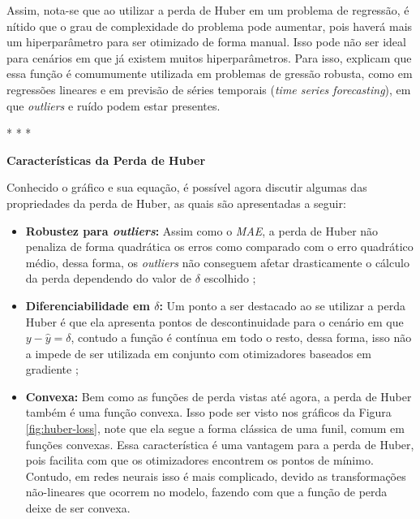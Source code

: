 Assim, nota-se que ao utilizar a perda de Huber em um problema de regressão, é nítido que o grau de complexidade do problema pode aumentar, pois haverá mais um hiperparâmetro para ser otimizado de forma manual. Isso pode não ser ideal para cenários em que já existem muitos hiperparâmetros. Para isso, \textcite{LossesArticle} explicam que essa função é comumumente utilizada em problemas de gressão robusta, como em regressões lineares e em previsão de séries temporais (\textit{time series forecasting}), em que \textit{outliers} e ruído podem estar presentes.

\medskip
\begin{center}
 * * *
\end{center}
\medskip

\textbf{Características da Perda de Huber}
\vspace{1em}

Conhecido o gráfico e sua equação, é possível agora discutir algumas das propriedades da perda de Huber, as quais são apresentadas a seguir:

\begin{itemize}
    \item \textbf{Robustez para \textit{outliers}:} Assim como o \textit{MAE}, a perda de Huber não penaliza de forma quadrática os erros como comparado com o erro quadrático médio, dessa forma, os \textit{outliers} não conseguem afetar drasticamente o cálculo da perda dependendo do valor de $\delta$ escolhido \parencite{LossesArticle};
    \item \textbf{Diferenciabilidade em $\delta$:} Um ponto a ser destacado ao se utilizar a perda Huber é que ela apresenta pontos de descontinuidade para o cenário em que $y - \hat{y} = \delta$, contudo a função é contínua em todo o resto, dessa forma, isso não a impede de ser utilizada em conjunto com otimizadores baseados em gradiente \parencite{LossesArticle};
    \item \textbf{Convexa:} Bem como as funções de perda vistas até agora, a perda de Huber também é uma função convexa. Isso pode ser visto nos gráficos da Figura \ref{fig:huber-loss}, note que ela segue a forma clássica de uma funil, comum em funções convexas. Essa característica é uma vantagem para a perda de Huber, pois facilita com que os otimizadores encontrem os pontos de mínimo. Contudo, em redes neurais isso é mais complicado, devido as transformações não-lineares que ocorrem no modelo, fazendo com que a função de perda deixe de ser convexa.
\end{itemize}

